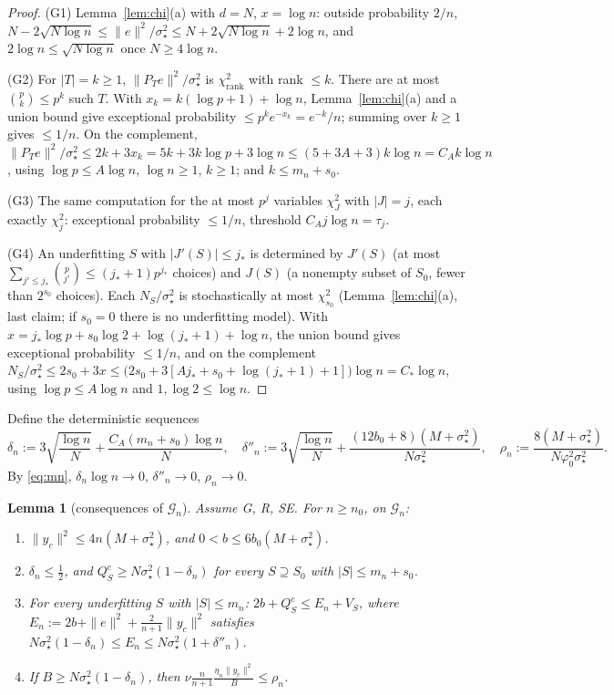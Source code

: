 \documentclass[11pt]{article}
\newtheorem{lemma}[theorem]{Lemma}
\theoremstyle{definition}
\newcommand{\1}{\mathbf 1}
\newcommand{\Gn}{\mathcal G_n}
\newcommand{\sst}{\sigma_\star^2}
\newcommand{\vp}{\varphi_0^2}
\begin{document}
\begin{proof}
(G1) Lemma~\ref{lem:chi}(a) with $d=N$, $x=\log n$: outside probability $2/n$, $N-2\sqrt{N\log n}\le\|e\|^2/\sst\le N+2\sqrt{N\log n}+2\log n$, and $2\log n\le\sqrt{N\log n}$ once $N\ge4\log n$.

(G2) For $|T|=k\ge1$, $\|P_Te\|^2/\sst$ is $\chi^2_{\operatorname{rank}}$ with rank $\le k$. There are at most $\binom pk\le p^k$ such $T$. With $x_k=k(\log p+1)+\log n$, Lemma~\ref{lem:chi}(a) and a union bound give exceptional probability $\le p^ke^{-x_k}=e^{-k}/n$; summing over $k\ge1$ gives $\le1/n$. On the complement, $\|P_Te\|^2/\sst\le2k+3x_k=5k+3k\log p+3\log n\le(5+3A+3)k\log n=C_Ak\log n$, using $\log p\le A\log n$, $\log n\ge1$, $k\ge1$; and $k\le m_n+s_0$.

(G3) The same computation for the at most $p^j$ variables $\chi^2_J$ with $|J|=j$, each exactly $\chi^2_j$: exceptional probability $\le1/n$, threshold $C_Aj\log n=\tau_j$.

(G4) An underfitting $S$ with $|J'(S)|\le j_*$ is determined by $J'(S)$ (at most $\sum_{j'\le j_*}\binom p{j'}\le(j_*+1)p^{j_*}$ choices) and $J(S)$ (a nonempty subset of $S_0$, fewer than $2^{s_0}$ choices). Each $N_S/\sst$ is stochastically at most $\chi^2_{s_0}$ (Lemma~\ref{lem:chi}(a), last claim; if $s_0=0$ there is no underfitting model). With $x=j_*\log p+s_0\log2+\log(j_*+1)+\log n$, the union bound gives exceptional probability $\le1/n$, and on the complement $N_S/\sst\le2s_0+3x\le\big(2s_0+3[Aj_*+s_0+\log(j_*+1)+1]\big)\log n=C_*\log n$, using $\log p\le A\log n$ and $1,\log 2\le\log n$.
\end{proof}

Define the deterministic sequences
\[
\delta_n:=3\sqrt{\frac{\log n}{N}}+\frac{C_A(m_n+s_0)\log n}{N},\quad
\delta''_n:=3\sqrt{\frac{\log n}{N}}+\frac{(12b_0+8)(M+\sst)}{N\sst},\quad
\rho_n:=\frac{8(M+\sst)}{N\vp\sst}.
\]
By \eqref{eq:mn}, $\delta_n\log n\to0$, $\delta''_n\to0$, $\rho_n\to0$.

\begin{lemma}[consequences of $\Gn$]\label{lem:ongood}
Assume G, R, SE. For $n\ge n_0$, on $\Gn$:
\begin{enumerate}
\item[(a)] $\|y_c\|^2\le4n(M+\sst)$, and $0<b\le6b_0(M+\sst)$.
\item[(b)] $\delta_n\le\frac12$, and $Q^c_S\ge N\sst(1-\delta_n)$ for every $S\supseteq S_0$ with $|S|\le m_n+s_0$.
\item[(c)] For every underfitting $S$ with $|S|\le m_n$: $2b+Q^c_S\le E_n+V_S$, where $E_n:=2b+\|e\|^2+\frac2{n+1}\|y_c\|^2$ satisfies $N\sst(1-\delta_n)\le E_n\le N\sst(1+\delta''_n)$.
\item[(d)] If $B\ge N\sst(1-\delta_n)$, then $\nu\frac n{n+1}\frac{\eta_n\|y_c\|^2}{B}\le\rho_n$.
\end{enumerate}
\end{lemma}
\end{document}
